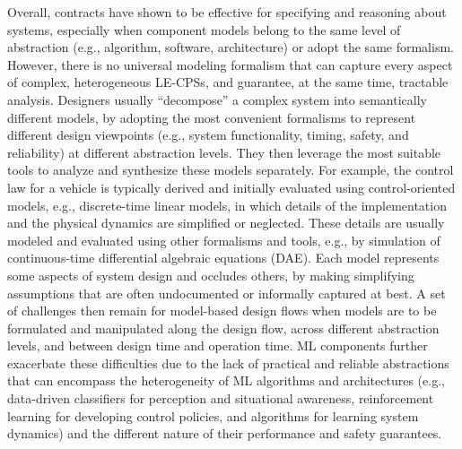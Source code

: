 Overall, contracts have shown to be effective for specifying and reasoning about systems, especially when component models belong to the same level of abstraction (e.g., algorithm, software, architecture) or adopt the same formalism. 
However, there is no universal modeling formalism that can capture every aspect of complex, heterogeneous LE-CPSs, and guarantee, at the same time, tractable analysis. Designers usually ``decompose'' a complex system into semantically different models, by adopting the most convenient formalisms to represent different design viewpoints (e.g., system functionality, timing, safety, and reliability) at different abstraction levels. They then leverage the most suitable tools to analyze and synthesize these models separately. 
For example, the control law for a vehicle is typically derived and initially evaluated using control-oriented models, e.g., discrete-time linear models, in which details of the implementation and the physical dynamics are simplified or neglected. These details are usually modeled and evaluated using other formalisms and tools, e.g., by simulation of continuous-time differential algebraic equations (DAE). Each model represents some aspects of system design and occludes others, by making simplifying assumptions that are often undocumented or informally captured at best. A set of challenges then remain for model-based design flows when models are to be formulated and manipulated along the design flow, across different abstraction levels, and between design time and operation time. ML components further exacerbate these difficulties due to the lack of practical and reliable abstractions that can encompass 
the heterogeneity of ML algorithms and architectures (e.g., data-driven classifiers for perception and situational awareness, reinforcement learning for developing control policies, and algorithms for learning system dynamics) and the different nature of their performance and safety guarantees.  



